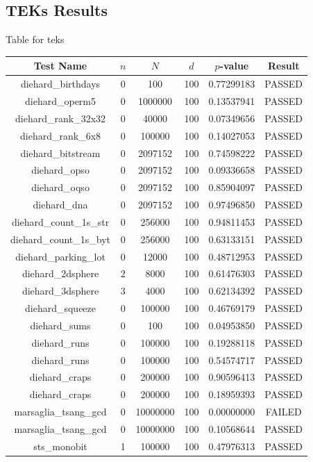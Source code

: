 \subsection{TEKs Results}
Table for teks
\begin{longtable}{cccccc}
\toprule
Test Name & $n$ & $N$ & $d$ & $p$-value & Result \\
\midrule
diehard\_birthdays & 0 & 100 & 100 & 0.77299183 & PASSED \\
diehard\_operm5 & 0 & 1000000 & 100 & 0.13537941 & PASSED \\
diehard\_rank\_32x32 & 0 & 40000 & 100 & 0.07349656 & PASSED \\
diehard\_rank\_6x8 & 0 & 100000 & 100 & 0.14027053 & PASSED \\
diehard\_bitstream & 0 & 2097152 & 100 & 0.74598222 & PASSED \\
diehard\_opso & 0 & 2097152 & 100 & 0.09336658 & PASSED \\
diehard\_oqso & 0 & 2097152 & 100 & 0.85904097 & PASSED \\
diehard\_dna & 0 & 2097152 & 100 & 0.97496850 & PASSED \\
diehard\_count\_1s\_str & 0 & 256000 & 100 & 0.94811453 & PASSED \\
diehard\_count\_1s\_byt & 0 & 256000 & 100 & 0.63133151 & PASSED \\
diehard\_parking\_lot & 0 & 12000 & 100 & 0.48712953 & PASSED \\
diehard\_2dsphere & 2 & 8000 & 100 & 0.61476303 & PASSED \\
diehard\_3dsphere & 3 & 4000 & 100 & 0.62134392 & PASSED \\
diehard\_squeeze & 0 & 100000 & 100 & 0.46769179 & PASSED \\
diehard\_sums & 0 & 100 & 100 & 0.04953850 & PASSED \\
diehard\_runs & 0 & 100000 & 100 & 0.19288118 & PASSED \\
diehard\_runs & 0 & 100000 & 100 & 0.54574717 & PASSED \\
diehard\_craps & 0 & 200000 & 100 & 0.90596413 & PASSED \\
diehard\_craps & 0 & 200000 & 100 & 0.18959393 & PASSED \\
marsaglia\_tsang\_gcd & 0 & 10000000 & 100 & 0.00000000 & FAILED \\
marsaglia\_tsang\_gcd & 0 & 10000000 & 100 & 0.10568644 & PASSED \\
sts\_monobit & 1 & 100000 & 100 & 0.47976313 & PASSED \\

\end{longtable}

